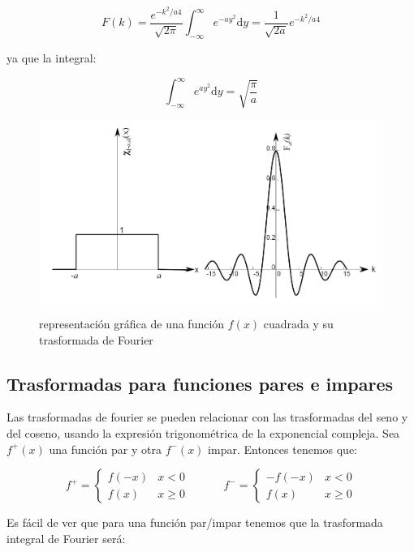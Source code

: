 \documentclass[12pt]{book}
\newcommand{\D}{\mathrm{d}}
\newcommand{\inti}{\int_{-\infty}^{\infty}}
\newcommand{\tquad}{\quad  \quad \quad}
\begin{document}
$$ F(k) = \dfrac{e^{-k^2/a4}}{\sqrt{2 \pi}} \inti e^{-a y^2} \D y = \dfrac{1}{\sqrt{2 a}} e^{-k^2/a4} $$

ya que la integral:

$$ \inti e^{ay^2} \D y =  \sqrt{\dfrac{\pi}{a}}  $$

\hrulefill

\begin{figure}[h!] \centering
\includegraphics[scale=0.5]{trasformadafourier1.png}
\caption{representación gráfica de una función $f(x)$ cuadrada y su trasformada de Fourier}
\label{Fig:6.2-1}
\end{figure}


\subsection{Trasformadas para funciones pares e impares} 

Las trasformadas de fourier se pueden relacionar con las trasformadas del seno y del coseno, usando la expresión trigonométrica de la exponencial compleja. Sea $f^+(x)$ una función par y otra $f^-(x)$ impar. Entonces tenemos que:

\begin{equation}
f^+ = \left\lbrace \begin{array}{ll} f(-x) & x < 0 \\ f(x) & x \geq 0 \end{array} \right. \tquad f^- = \left\lbrace \begin{array}{ll} -f(-x) & x < 0 \\ f(x) & x \geq 0 \end{array} \right.
\end{equation}


Es fácil de ver que para una función par/impar tenemos que la trasformada integral de Fourier será:
\end{document}
